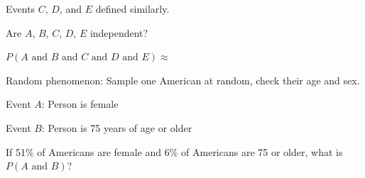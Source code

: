\documentclass[11pt,letterpaper,twoside]{article}
\begin{document}
Events $C$, $D$, and $E$ defined similarly.  \vspace{10pt}

Are $A$, $B$, $C$, $D$, $E$ independent? \vspace{150pt}

$P(A\text{ and }B\text{ and }C\text{ and }D\text{ and }E)\approx$ \vspace{50pt}

Random phenomenon: Sample one American at random, check their age and sex. \vspace{10pt}

Event $A$: Person is female \vspace{10pt}

Event $B$: Person is 75 years of age or older \vspace{10pt}

If 51\% of Americans are female and 6\%  of Americans are 75 or older, what is $P(A\text{ and }B)$?

\label{totalpag}
\end{document}
